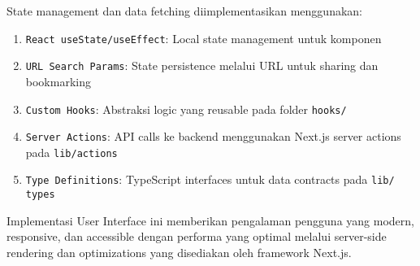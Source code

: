 State management dan data fetching diimplementasikan menggunakan:

\begin{enumerate}
	\item \texttt{React useState/useEffect}: Local state management untuk komponen
	\item \texttt{URL Search Params}: State persistence melalui URL untuk sharing dan bookmarking
	\item \texttt{Custom Hooks}: Abstraksi logic yang reusable pada folder \texttt{hooks/}
	\item \texttt{Server Actions}: API calls ke backend menggunakan Next.js server actions pada \texttt{lib/actions}
	\item \texttt{Type Definitions}: TypeScript interfaces untuk data contracts pada \texttt{lib/\\types}
\end{enumerate}

Implementasi User Interface ini memberikan pengalaman pengguna yang modern, responsive, dan accessible dengan performa yang optimal melalui server-side rendering dan optimizations yang disediakan oleh framework Next.js.
